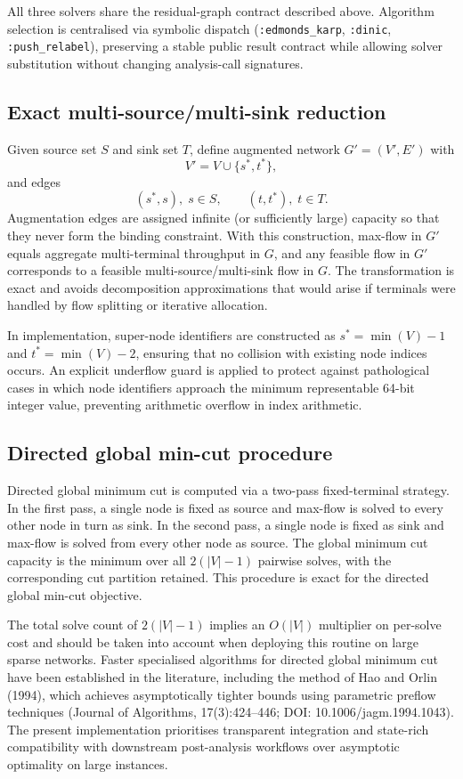 \documentclass[12pt]{report}
\begin{document}
All three solvers share the residual-graph contract described above. Algorithm selection is centralised via symbolic dispatch (\texttt{:edmonds\_karp}, \texttt{:dinic}, \texttt{:push\_relabel}), preserving a stable public result contract while allowing solver substitution without changing analysis-call signatures.

\subsection{Exact multi-source/multi-sink reduction}

Given source set $S$ and sink set $T$, define augmented network $G'=(V',E')$ with
\[
V'=V\cup\{s^*,t^*\},
\]
and edges
\[
(s^*,s),\; s\in S,
\qquad
(t,t^*),\; t\in T.
\]
Augmentation edges are assigned infinite (or sufficiently large) capacity so that they never form the binding constraint. With this construction, max-flow in $G'$ equals aggregate multi-terminal throughput in $G$, and any feasible flow in $G'$ corresponds to a feasible multi-source/multi-sink flow in $G$. The transformation is exact and avoids decomposition approximations that would arise if terminals were handled by flow splitting or iterative allocation.

In implementation, super-node identifiers are constructed as $s^* = \min(V) - 1$ and $t^* = \min(V) - 2$, ensuring that no collision with existing node indices occurs. An explicit underflow guard is applied to protect against pathological cases in which node identifiers approach the minimum representable 64-bit integer value, preventing arithmetic overflow in index arithmetic.

\subsection{Directed global min-cut procedure}

Directed global minimum cut is computed via a two-pass fixed-terminal strategy. In the first pass, a single node is fixed as source and max-flow is solved to every other node in turn as sink. In the second pass, a single node is fixed as sink and max-flow is solved from every other node as source. The global minimum cut capacity is the minimum over all $2(|V|-1)$ pairwise solves, with the corresponding cut partition retained. This procedure is exact for the directed global min-cut objective.

The total solve count of $2(|V|-1)$ implies an $O(|V|)$ multiplier on per-solve cost and should be taken into account when deploying this routine on large sparse networks. Faster specialised algorithms for directed global minimum cut have been established in the literature, including the method of Hao and Orlin (1994), which achieves asymptotically tighter bounds using parametric preflow techniques (Journal of Algorithms, 17(3):424--446; DOI: 10.1006/jagm.1994.1043). The present implementation prioritises transparent integration and state-rich compatibility with downstream post-analysis workflows over asymptotic optimality on large instances.
\end{document}
